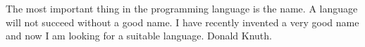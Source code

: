 %
%

\label{sec:conclusiones}
{%
  The most important thing in the programming language is the name. A
  language will not succeed without a good name. I have recently invented a
  very good name and now I am looking for a suitable language.%
}
{%
   Donald Knuth.%
}

\noindent
